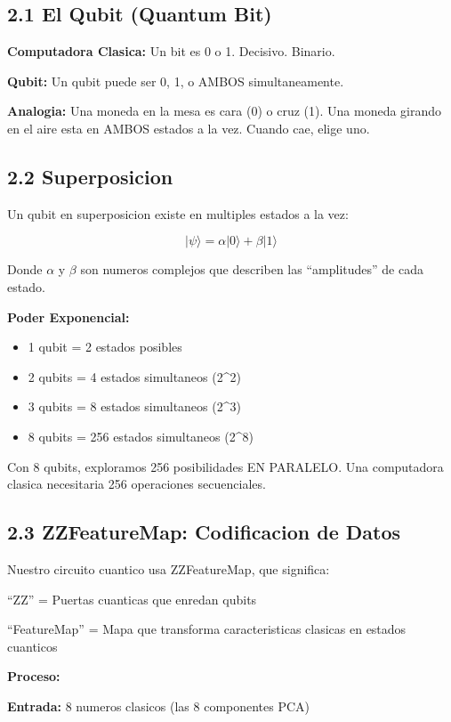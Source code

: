 \documentclass[11pt]{article}
\begin{document}
\subsection*{2.1 El Qubit (Quantum Bit)}

\textbf{Computadora Clasica:}
Un bit es 0 o 1. Decisivo. Binario.

\textbf{Qubit:}
Un qubit puede ser 0, 1, o AMBOS simultaneamente.

\textbf{Analogia:} Una moneda en la mesa es cara (0) o cruz (1). Una moneda girando en el aire esta en AMBOS estados a la vez. Cuando cae, elige uno.

\subsection*{2.2 Superposicion}

Un qubit en superposicion existe en multiples estados a la vez:

$$|\psi\rangle = \alpha|0\rangle + \beta|1\rangle$$

Donde $\alpha$ y $\beta$ son numeros complejos que describen las ``amplitudes'' de cada estado.

\textbf{Poder Exponencial:}
\begin{itemize}
\item 1 qubit = 2 estados posibles
\item 2 qubits = 4 estados simultaneos (2^2)
\item 3 qubits = 8 estados simultaneos (2^3)
\item 8 qubits = 256 estados simultaneos (2^8)
\end{itemize}

Con 8 qubits, exploramos 256 posibilidades EN PARALELO. Una computadora clasica necesitaria 256 operaciones secuenciales.

\subsection*{2.3 ZZFeatureMap: Codificacion de Datos}

Nuestro circuito cuantico usa ZZFeatureMap, que significa:

``ZZ'' = Puertas cuanticas que enredan qubits

``FeatureMap'' = Mapa que transforma caracteristicas clasicas en estados cuanticos

\textbf{Proceso:}

\textbf{Entrada:} 8 numeros clasicos (las 8 componentes PCA)
\end{document}
